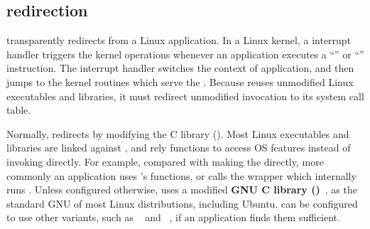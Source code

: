 \subsection{\Linuxapi{} redirection}


\thelibos{} transparently redirects \linuxapis{} from a Linux application. In a Linux kernel, a \linuxapi{} interrupt handler
triggers the kernel operations
whenever an application executes
a ``'' or ``'' instruction.
The interrupt handler
switches the context of application,
and then jumps to the kernel routines which serve the \linuxapis{}.
Because \thelibos{} reuses
unmodified Linux executables and libraries,
it must redirect
unmodified \linuxapi{} invocation
to its
system call table. %


Normally,
\thelibos{} redirects \linuxapis{} %
by modifying the C library (\libc{}).
Most Linux executables and libraries
are linked against \libc{},
and rely \libc{} functions to access OS features
instead of
invoking \linuxapis{} directly.
For example,
compared with making the  \linuxapi{} directly,
more commonly
an application uses \libc{}'s  functions,
or calls the \libc{}  wrapper
which internally runs .
Unless configured otherwise, \thelibos{} uses a modified
{\bf GNU C library (\glibc{})}~\cite{glibc},
as the standard GNU \libc{} of most Linux distributions, including Ubuntu.
\graphene{} can be configured to use other \libc{} variants,
such as ~\cite{uclibc} and ~\cite{musl},
if an application finds them sufficient.




